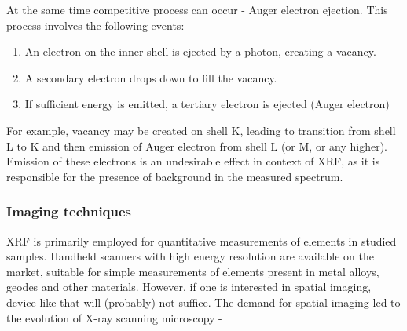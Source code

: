 At the same time competitive process can occur - Auger electron ejection. This process involves the following events\cite{augerElectron}:
\begin{enumerate}
    \item An electron on the inner shell is ejected by a photon, creating a vacancy.
    \item A secondary electron drops down to fill the vacancy.
    \item If sufficient energy is emitted, a tertiary electron is ejected (Auger electron)
\end{enumerate}
For example, vacancy may be created on shell K, leading to transition from shell L to K and then emission of Auger electron from shell L (or M, or any higher).
Emission of these electrons is an undesirable effect in context of XRF, as it is responsible for the presence of background in the measured spectrum.

\subsubsection{Imaging techniques}
XRF is primarily employed for quantitative measurements of elements in studied samples. 
Handheld scanners with high energy resolution are available on the market, suitable for simple measurements of elements present in metal alloys, geodes and other materials. 
However, if one is interested in spatial imaging, device like that will (probably) not suffice. 
The demand for spatial imaging led to the evolution of X-ray scanning microscopy - 

